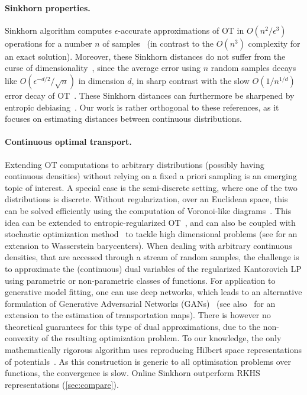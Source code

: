 \paragraph{Sinkhorn properties.} Sinkhorn algorithm computes $\epsilon$-accurate
approximations of OT in $O(n^2/\epsilon^3)$ operations for a number $n$ of
samples~\citep{altschuler2017near} (in contrast to the $O(n^3)$ complexity for an
exact solution). Moreover, these Sinkhorn distances do not suffer from the
curse of dimensionality~\citep{2019-Genevay-aistats}, since the average error
using $n$ random samples decays like $O(\epsilon^{-d/2}/\sqrt{n})$ in dimension
$d$, in sharp contrast with the slow $O(1/n^{1/d})$ error decay of
OT~\citep{dudley_speed_1969,weed2019sharp}. These Sinkhorn distances can furthermore be sharpened
by entropic debiasing~\citep{2019-Feydy-aistats}. Our work is rather orthogonal to these references, as it focuses on estimating distances between continuous distributions.

\paragraph{Continuous optimal transport.} Extending OT computations to arbitrary
distributions (possibly having continuous densities) without relying on a fixed
a priori sampling is an emerging topic of interest. A special case is the
semi-discrete setting, where one of the two distributions is discrete. Without
regularization, over an Euclidean space, this can be solved efficiently using
the computation of Voronoi-like diagrams~\citep{merigot2011multiscale}. This
idea can be extended to entropic-regularized OT~\citep{cuturi2018semidual}, and
can also be coupled with stochastic optimization
method~\citep{2016-genevay-nips} to tackle high dimensional problems (see
 \cite{staib2017parallel} for an extension to Wasserstein barycenters). When dealing with arbitrary continuous densities, that are accessed through a
stream of random samples, the challenge is to approximate  the (continuous) dual
variables of the regularized Kantorovich LP using parametric or non-parametric
classes of functions. For application to generative model fitting, one can use
deep networks, which leads to an alternative formulation of Generative
Adversarial Networks (GANs)~\citep{arjovsky2017wgan} (see
also~\citet{seguy2018large} for an extension to the estimation of transportation
maps). There is however no theoretical guarantees for this type of dual
approximations, due to the non-convexity of the resulting optimization problem.
To our knowledge, the only mathematically rigorous algorithm uses reproducing
Hilbert space representations of potentials~\citep{2016-genevay-nips}. As this
construction is generic to all optimisation problems over functions, the convergence is slow. Online Sinkhorn outperform RKHS representations (\autoref{sec:compare}).

